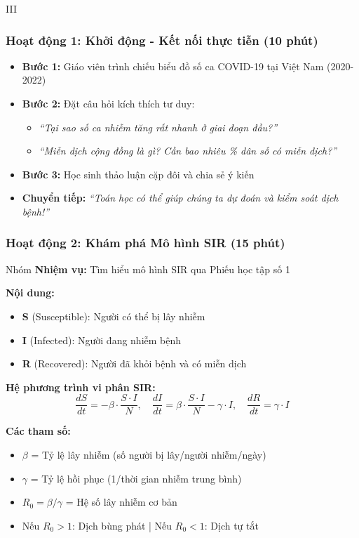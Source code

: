 \documentclass[12pt,a4paper]{article}
\begin{document}
\begin{competitionsection}{III}
\subsubsection*{Hoạt động 1: Khởi động - Kết nối thực tiễn (10 phút)}
\begin{itemize}[leftmargin=*,noitemsep]
\item \textbf{Bước 1:} Giáo viên trình chiếu biểu đồ số ca COVID-19 tại Việt Nam (2020-2022)
\item \textbf{Bước 2:} Đặt câu hỏi kích thích tư duy:
    \begin{itemize}
    \item \textit{``Tại sao số ca nhiễm tăng rất nhanh ở giai đoạn đầu?''}
    \item \textit{``Miễn dịch cộng đồng là gì? Cần bao nhiêu \% dân số có miễn dịch?''}
    \end{itemize}
\item \textbf{Bước 3:} Học sinh thảo luận cặp đôi và chia sẻ ý kiến
\item \textbf{Chuyển tiếp:} \textit{``Toán học có thể giúp chúng ta dự đoán và kiểm soát dịch bệnh!''}
\end{itemize}

\subsubsection*{Hoạt động 2: Khám phá Mô hình SIR (15 phút)}
\begin{task}{Nhóm}
\textbf{Nhiệm vụ:} Tìm hiểu mô hình SIR qua Phiếu học tập số 1

\textbf{Nội dung:}
\begin{itemize}[leftmargin=*,noitemsep]
\item \textbf{S} (Susceptible): Người có thể bị lây nhiễm
\item \textbf{I} (Infected): Người đang nhiễm bệnh
\item \textbf{R} (Recovered): Người đã khỏi bệnh và có miễn dịch
\end{itemize}
\end{task}

\begin{keyformula}
\textbf{Hệ phương trình vi phân SIR:}
$$\frac{dS}{dt} = -\beta \cdot \frac{S \cdot I}{N}, \quad \frac{dI}{dt} = \beta \cdot \frac{S \cdot I}{N} - \gamma \cdot I, \quad \frac{dR}{dt} = \gamma \cdot I$$

\textbf{Các tham số:}
\begin{itemize}[leftmargin=*,noitemsep]
\item $\beta$ = Tỷ lệ lây nhiễm (số người bị lây/người nhiễm/ngày)
\item $\gamma$ = Tỷ lệ hồi phục (1/thời gian nhiễm trung bình)
\item $R_0 = \beta/\gamma$ = Hệ số lây nhiễm cơ bản
\item Nếu $R_0 > 1$: Dịch bùng phát | Nếu $R_0 < 1$: Dịch tự tắt
\end{itemize}


\end{keyformula}
\end{competitionsection}
\end{document}
